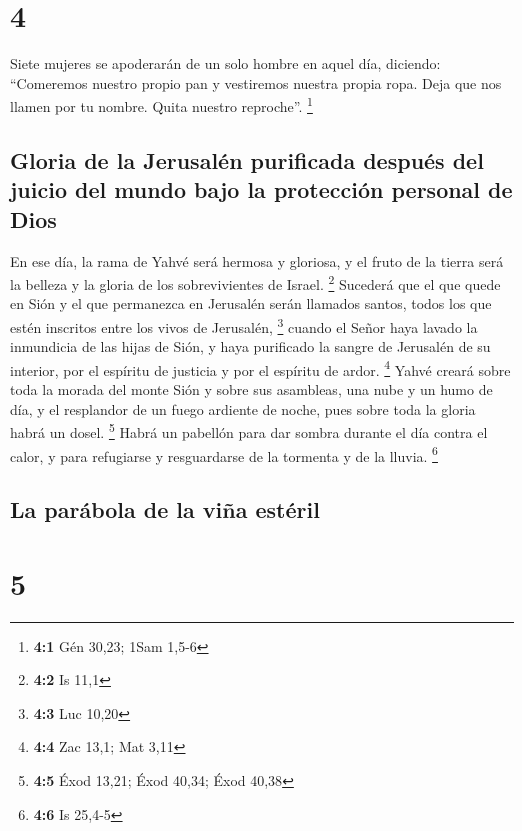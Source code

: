 \hypertarget{section-3}{%
\section{4}\label{section-3}}

 Siete mujeres se apoderarán de un solo hombre en aquel
día, diciendo: ``Comeremos nuestro propio pan y vestiremos nuestra
propia ropa. Deja que nos llamen por tu nombre. Quita nuestro
reproche''. \footnote{\textbf{4:1} Gén 30,23; 1Sam 1,5-6}

\hypertarget{gloria-de-la-jerusaluxe9n-purificada-despuuxe9s-del-juicio-del-mundo-bajo-la-protecciuxf3n-personal-de-dios}{%
\subsection{Gloria de la Jerusalén purificada después del juicio del
mundo bajo la protección personal de
Dios}\label{gloria-de-la-jerusaluxe9n-purificada-despuuxe9s-del-juicio-del-mundo-bajo-la-protecciuxf3n-personal-de-dios}}

 En ese día, la rama de Yahvé será hermosa y gloriosa, y
el fruto de la tierra será la belleza y la gloria de los sobrevivientes
de Israel. \footnote{\textbf{4:2} Is 11,1}  Sucederá que
el que quede en Sión y el que permanezca en Jerusalén serán llamados
santos, todos los que estén inscritos entre los vivos de Jerusalén,
\footnote{\textbf{4:3} Luc 10,20}  cuando el Señor haya
lavado la inmundicia de las hijas de Sión, y haya purificado la sangre
de Jerusalén de su interior, por el espíritu de justicia y por el
espíritu de ardor. \footnote{\textbf{4:4} Zac 13,1; Mat 3,11}
 Yahvé creará sobre toda la morada del monte Sión y sobre
sus asambleas, una nube y un humo de día, y el resplandor de un fuego
ardiente de noche, pues sobre toda la gloria habrá un dosel. \footnote{\textbf{4:5}
  Éxod 13,21; Éxod 40,34; Éxod 40,38}  Habrá un pabellón
para dar sombra durante el día contra el calor, y para refugiarse y
resguardarse de la tormenta y de la lluvia. \footnote{\textbf{4:6} Is
  25,4-5}

\hypertarget{la-paruxe1bola-de-la-viuxf1a-estuxe9ril}{%
\subsection{La parábola de la viña
estéril}\label{la-paruxe1bola-de-la-viuxf1a-estuxe9ril}}

\hypertarget{section-4}{%
\section{5}\label{section-4}}

